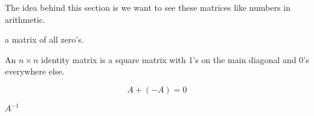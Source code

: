 The idea behind this section is we want to see these matrices like numbers in arithmetic.

\begin{definition}
	a matrix of all zero's.
\end{definition}

\begin{definition}
	An $n\times n$ identity matrix is a square matrix with 1's on the main diagonal and
	0's everywhere else.
\end{definition}

\begin{definition}
	\[A + (-A) = 0\]
\end{definition}

\begin{definition}
	$A^{-1}$
\end{definition}



\newpage



